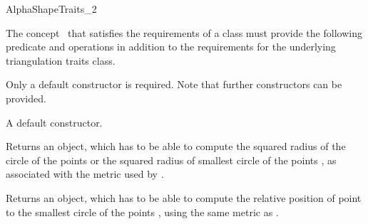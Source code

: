 \begin{ccRefConcept} {AlphaShapeTraits_2}


\ccDefinition
The concept \ccRefName\ that satisfies the requirements of a
 class must provide the following predicate and
operations in addition to the requirements for the underlying triangulation
traits class.

\ccTypes


\ccCreation

Only a default constructor is required. Note that further constructors
can be provided. 

{A default constructor.}


{Returns an object, which has to be able to compute the squared radius of the
circle of the points  or the squared radius of smallest  circle
of the points , as  associated with the metric used
by .} 


{Returns an object, which has to be able to compute the relative position of
point  to the smallest circle of the points , using the
same metric as .}

\end{ccRefConcept}

